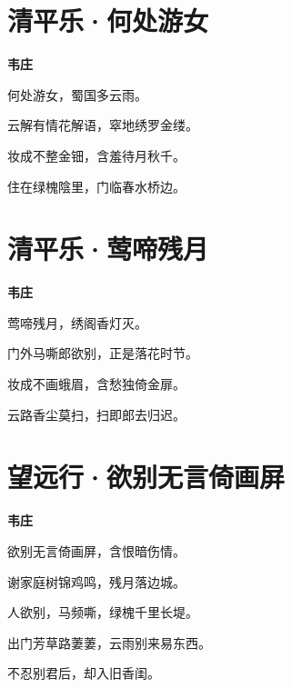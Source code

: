 \documentclass[12pt,a4paper]{ctexbook}
\begin{document}
\section{清平乐·何处游女}
\textbf{韦庄}\par\vspace{0.5em}
何处游女，蜀国多云雨。\par
云解有情花解语，窣地绣罗金缕。\par
妆成不整金钿，含羞待月秋千。\par
住在绿槐陰里，门临春水桥边。\par

\section{清平乐·莺啼残月}
\textbf{韦庄}\par\vspace{0.5em}
莺啼残月，绣阁香灯灭。\par
门外马嘶郎欲别，正是落花时节。\par
妆成不画蛾眉，含愁独倚金扉。\par
云路香尘莫扫，扫即郎去归迟。\par

\section{望远行·欲别无言倚画屏}
\textbf{韦庄}\par\vspace{0.5em}
欲别无言倚画屏，含恨暗伤情。\par
谢家庭树锦鸡鸣，残月落边城。\par
人欲别，马频嘶，绿槐千里长堤。\par
出门芳草路萋萋，云雨别来易东西。\par
不忍别君后，却入旧香闺。\par
\end{document}
